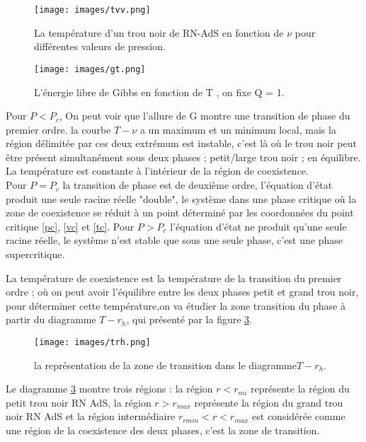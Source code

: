 \documentclass[12pt,  a4paper, openright]{report} %
\begin{document}
\begin{figure}[H]
\begin{center}
	\texttt{[image: images/tvv.png]}
	\caption{La température d’un trou noir de RN-AdS en fonction de $\nu$ pour différentes valeurs de pression.}
	\label{tv}
\end{center}
\end{figure}

\begin{figure}
	\begin{center}
		\texttt{[image: images/gt.png]}
		\caption{L’énergie libre de Gibbs en fonction de T , on fixe
			Q = 1.}
		\label{gt}
	\end{center}
\end{figure}

Pour $ P < P_{c}$, On peut voir que l’allure de G montre une transition de phase du premier
ordre.  la courbe   $ T  -\nu$ a un
maximum et un minimum local, mais la région délimitée par ces deux extrémum  est instable, c’est là où le trou noir peut être présent simultanément sous deux
phases ; petit/large trou noir ; en équilibre. La température est constante à l’intérieur de
la région de coexistence.\\
Pour $P = P_{c}$ la transition de phase est de deuxième ordre, l’équation d’état produit une
seule racine réelle "double", le système dans une phase critique où la zone de coexistence se
réduit à un point déterminé par les coordonnées du point critique \ref{pc}, \ref{vc} et \ref{tc}.
Pour $P> P_{c}$ l’équation d’état ne produit qu’une seule racine réelle, le système n’est
stable que sous une seule phase, c’est une phase supercritique.


La température de coexistence est la température de la transition du premier ordre ; où on
peut avoir l’équilibre entre les deux phases petit et grand trou noir, pour déterminer cette
température,on va étudier la zone transition du phase à partir du
diagramme $T - r_{h}$, qui présenté par la figure \ref{trrh}.

\begin{figure}[H]
	\begin{center}
		\texttt{[image: images/trh.png]}
		\caption{la représentation de la zone de transition dans le diagramme$ T- r_{h}$.}
		\label{trrh}
	\end{center}
\end{figure}

Le diagramme \ref{trrh} montre trois régions : la région $r < r_{mi}$ représente la région du petit
trou noir RN AdS, la région $r > r_{max}$ représente la région du grand trou noir RN AdS et la
région intermédiaire $r_{rmin} < r < r_{max}$ est considérée comme une région de la coexistence des
deux phases, c'est la zone de transition.
\end{document}
